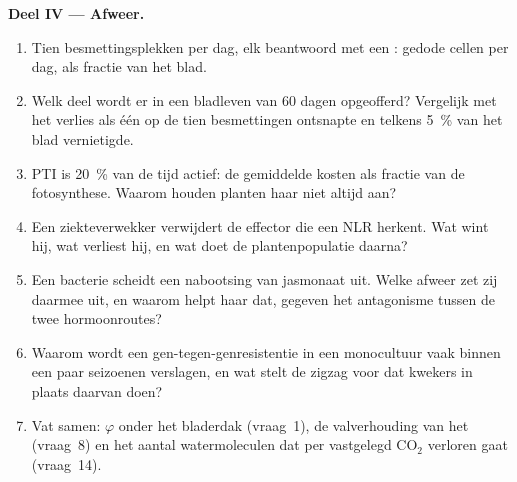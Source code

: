 \begin{problem}
\medskip
\noindent\textbf{Deel IV --- Afweer.}
\begin{enumerate}[resume]
  \item Tien besmettingsplekken per dag, elk beantwoord met een
        : gedode cellen per dag, als fractie
        van het blad.
  \item Welk deel wordt er in een bladleven van 60 dagen opgeofferd?
        Vergelijk met het verlies als één op de tien besmettingen
        ontsnapte en telkens \qty{5}{\%} van het blad vernietigde.
  \item PTI is \qty{20}{\%} van de tijd actief: de gemiddelde kosten
        als fractie van de fotosynthese. Waarom houden planten haar
        niet altijd aan?
  \item Een ziekteverwekker verwijdert de effector die een NLR herkent.
        Wat wint hij, wat verliest hij, en wat doet de plantenpopulatie
        daarna?
  \item Een bacterie scheidt een nabootsing van jasmonaat uit. Welke
        afweer zet zij daarmee uit, en waarom helpt haar dat, gegeven
        het antagonisme tussen de twee hormoonroutes?
  \item Waarom wordt een gen-tegen-genresistentie in een monocultuur
        vaak binnen een paar seizoenen verslagen, en wat stelt de
        zigzag voor dat kwekers in plaats daarvan doen?
  \item Vat samen: $\varphi$ onder het bladerdak (vraag~1), de
        valverhouding van het  (vraag~8) en het aantal
        watermoleculen dat per vastgelegd CO$_{2}$ verloren gaat
        (vraag~14).
\end{enumerate}
\end{problem}
